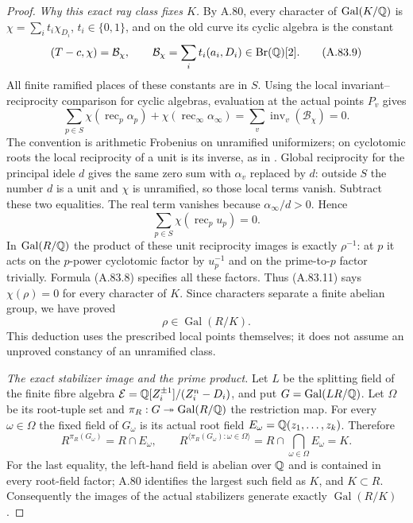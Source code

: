 \begin{proof}
\emph{Why this exact ray class fixes $K$.}
By A.80, every character of $\operatorname{Gal}(K/\mathbb Q)$ is
$\chi=\sum_i t_i\chi_{D_i}$, $t_i\in\{0,1\}$, and on the
old curve its cyclic algebra is the constant
\[
 (T-c,\chi)=\mathcal B_\chi,\qquad
                 \mathcal B_\chi=\sum_i t_i(a_i,D_i)
                                      \in\operatorname{Br}(\mathbb Q)[2].
 \tag{A.83.9}
\]
All finite ramified places of these constants are in $S$.
Using the local invariant--reciprocity comparison for cyclic
algebras, evaluation at the actual points $P_v$ gives
\[
 \sum_{p\in S}\chi(\operatorname{rec}_p\alpha_p)
       +\chi(\operatorname{rec}_\infty\alpha_\infty)
       =\sum_v\operatorname{inv}_v(\mathcal B_\chi)=0.
 \tag{A.83.10}
\]
The convention is arithmetic Frobenius on unramified uniformizers;
on cyclotomic roots the local reciprocity of a unit is its inverse,
as in \cite[I, Example 3.13; III, Proposition 3.6]{MilneCFT}.
Global reciprocity for the principal idele $d$ gives the same
zero sum with $\alpha_v$ replaced by $d$: outside $S$ the number
$d$ is a unit and $\chi$ is unramified, so those local terms vanish.
Subtract these two equalities.  The real term vanishes because
$\alpha_\infty/d>0$.  Hence
\[
                    \sum_{p\in S}\chi(\operatorname{rec}_p u_p)=0.
 \tag{A.83.11}
\]
In $\operatorname{Gal}(R/\mathbb Q)$ the product of these unit reciprocity
images is exactly $\rho^{-1}$: at $p$ it acts on the $p$-power
cyclotomic factor by $u_p^{-1}$ and on the prime-to-$p$ factor
trivially.  Formula (A.83.8) specifies all these factors.
Thus (A.83.11) says $\chi(\rho)=0$ for every character of $K$.
Since characters separate a finite abelian group, we have proved
\[
                            \rho\in\operatorname{Gal}(R/K).
 \tag{A.83.12}
\]
This deduction uses the prescribed local points themselves;
it does not assume an unproved constancy of an unramified class.

\emph{The exact stabilizer image and the prime product.}
Let $L$ be the splitting field of the finite fibre algebra
$\mathcal E=\mathbb Q[Z_i^{\pm1}]/(Z_i^n-D_i)$, and put
$G=\operatorname{Gal}(LR/\mathbb Q)$.
Let $\Omega$ be its root-tuple set and
$\pi_R:G\twoheadrightarrow\operatorname{Gal}(R/\mathbb Q)$ the
restriction map.  For every $\omega\in\Omega$ the fixed field
of $G_\omega$ is its actual root field
$E_\omega=\mathbb Q(z_1,\ldots,z_k)$.  Therefore
\[
 R^{\pi_R(G_\omega)}=R\cap E_\omega,\qquad
 R^{\langle\pi_R(G_\omega):\omega\in\Omega\rangle}
      =R\cap\bigcap_{\omega\in\Omega}E_\omega=K.
 \tag{A.83.13}
\]
For the last equality, the left-hand field is abelian over $\mathbb Q$
and is contained in every root-field factor; A.80 identifies
the largest such field as $K$, and $K\subset R$.
Consequently the images of the actual stabilizers generate
exactly $\operatorname{Gal}(R/K)$.


\end{proof}
